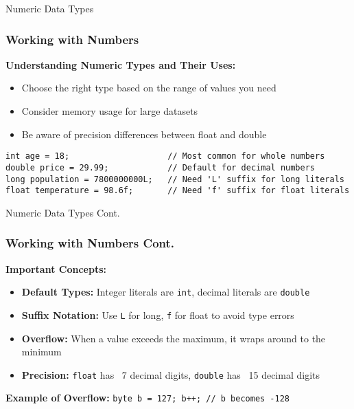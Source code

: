 \documentclass[aspectratio=169]{beamer}
\begin{document}
\begin{frame}[fragile]{Numeric Data Types}
    \frametitle{Working with Numbers}
    
    \textbf{Understanding Numeric Types and Their Uses:}
    \begin{itemize}
        \item Choose the right type based on the range of values you need
        \item Consider memory usage for large datasets
        \item Be aware of precision differences between float and double
    \end{itemize}
    
    \begin{lstlisting}
int age = 18;                    // Most common for whole numbers
double price = 29.99;            // Default for decimal numbers
long population = 7800000000L;   // Need 'L' suffix for long literals
float temperature = 98.6f;       // Need 'f' suffix for float literals
    \end{lstlisting}
    
    
\end{frame}
\begin{frame}{Numeric Data Types Cont.}
    \frametitle{Working with Numbers Cont.}
    \textbf{Important Concepts:}
    \begin{itemize}
        \item \textbf{Default Types:} Integer literals are \texttt{int}, decimal literals are \texttt{double}
        \item \textbf{Suffix Notation:} Use \texttt{L} for long, \texttt{f} for float to avoid type errors
        \item \textbf{Overflow:} When a value exceeds the maximum, it wraps around to the minimum
        \item \textbf{Precision:} \texttt{float} has ~7 decimal digits, \texttt{double} has ~15 decimal digits
    \end{itemize}
    
    \vspace{0.3em}
    \small \textbf{Example of Overflow:} \texttt{byte b = 127; b++; // b becomes -128}
\end{frame}
\end{document}
